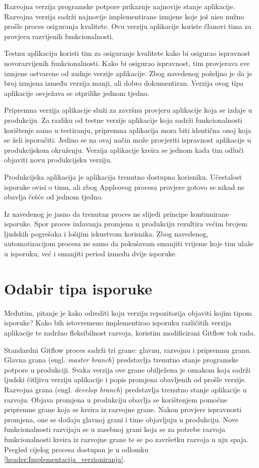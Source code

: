 \documentclass[times, utf8, diplomski, numeric]{fer}
\newcommand{\eng}[1]{(engl. \textit{#1})}
\begin{document}
Razvojna verzija programske potpore prikazuje najnovije stanje aplikacije. Razvojna verzija sadrži najnovije implementirane izmjene koje još nisu nužno prošle proces osiguranja kvalitete. Ovu verziju aplikacije koriste članovi tima za provjeru razvijenih funkcionalnosti.

Testnu aplikaciju koristi tim za osiguranje kvalitete kako bi osigurao ispravnost novorazvijenih funkcionalnosti. Kako bi osigurao ispravnost, tim provjerava sve izmjene ostvarene od zadnje verzije aplikacije. Zbog navedenog poželjno je da je broj izmjena između verzija manji, ali dobro dokumentiran. Verzija ovog tipa aplikacije osvježava se otprilike jednom tjedno.

Pripremna verzija aplikacije služi za završnu provjeru aplikacije koja se izdaje u produkciju. Za razliku od testne verzije aplikacije koja sadrži funkcionalnosti korištenje samo u testiranju, pripremna aplikacija mora biti identična onoj koja se želi isporučiti. Jedino se na ovaj način može provjeriti ispravnost aplikacije u produkcijskom okruženju. Verzija aplikacije kreira se jednom kada tim odluči objaviti novu produkcijsku verziju.

Produkcijska aplikacija je aplikacija trenutno dostupna korisniku. Učestalost isporuke ovisi o timu, ali zbog Appleovog procesa provjere gotovo se nikad ne obavlja češće od jednom tjedno.

Iz navedenog je jasno da trenutan proces ne slijedi principe kontinuirane isporuke. Spor proces izdavanja promjena u produkciju rezultira većim brojem ljudskih pogrešaka i lošijim iskustvom korisnika. Zbog navedenog, automatizacijom procesa ne samo da pokušavam smanjiti vrijeme koje tim ulaže u isporuku, već i smanjiti period između dvije isporuke.


\section{Odabir tipa isporuke}

Međutim, pitanje je kako odrediti koju verziju repozitorija objaviti kojim tipom isporuke? Kako bih istovremeno implementirao isporuku različitih verzija aplikacije te zadržao fleksibilnost razvoja, koristim modificirani Gitflow tok rada.

Standardni Gitflow proces sadrži tri grane: glavnu, razvojnu i pripremnu granu. Glavna grana \eng{master branch} predstavlja trenutno stanje programske potpore u produkciji. Svaka verzija ove grane obilježena je oznakom koja sadrži ljudski čitljivu verziju aplikacije i popis promjena obavljenih od prošle verzije. Razvojna grana \eng{develop branch} predstavlja trenutno stanje aplikacije u razvoju. Objava promjena u produkciju obavlja se korištenjem pomoćne pripremne grane koja se kreira iz razvojne grane. Nakon provjere ispravnosti promjena, one se dodaju glavnoj grani i time objavljuju u produkciju. Nove funkcionalnosti razvijaju se u zasebnoj grani koja se za potrebe razvoja funkcionalnosti kreira iz razvojne grane te se po završetku razvoja u nju spaja. Pregled cijelog procesa dostupan je u odlomku \ref{header:Implementacija_verzioniranja}.
\end{document}
